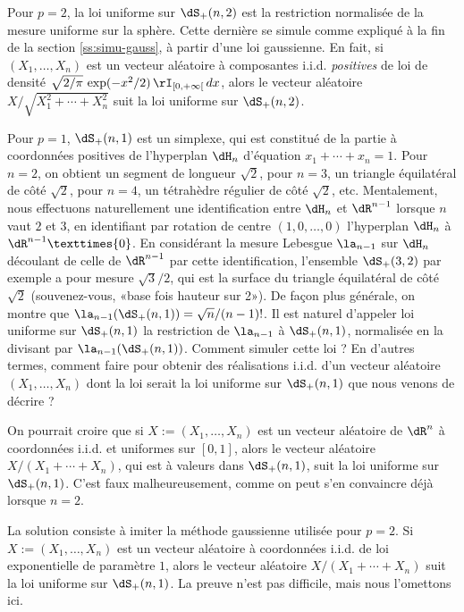 Pour $p=2$, la loi uniforme sur $\dS_+(n,2)$ est la restriction normalisée de
la mesure uniforme sur la sphère. Cette dernière se simule comme expliqué à la
fin de la section \ref{ss:simu-gauss}, à partir d'une loi gaussienne. En fait,
si $(X_1,\ldots,X_n)$ est un vecteur aléatoire à composantes i.i.d.
\emph{positives} de loi de densité
$\sqrt{2/\pi}\,\exp(-x^2/2)\,\rI_{[0,+\infty[}\,dx$, alors le vecteur aléatoire
$X/\sqrt{X_1^2+\cdots+X_n^2}$ suit la loi uniforme sur $\dS_+(n,2)$.

Pour $p=1$, $\dS_+(n,1)$ est un simplexe, qui est constitué de la partie à
coordonnées positives de l'hyperplan $\dH_n$ d'équation $x_1+\cdots+x_n=1$.
Pour $n=2$, on obtient un segment de longueur $\sqrt{2}$, pour $n=3$, un
triangle équilatéral de côté $\sqrt{2}$, pour $n=4$, un tétrahèdre régulier de
côté $\sqrt{2}$, etc.  Mentalement, nous effectuons naturellement une
identification entre $\dH_n$ et $\dR^{n-1}$ lorsque $n$ vaut $2$ et $3$, en
identifiant par rotation de centre $(1,0,\ldots,0)$ l'hyperplan $\dH_n$ à
$\dR^{n-1}×\{0\}$. En considérant la mesure Lebesgue $\la_{n-1}$ sur
$\dH_n$ découlant de celle de $\dR^{n-1}$ par cette identification, l'ensemble
$\dS_+(3,2)$ par exemple a pour mesure $\sqrt{3}/2$, qui est la surface du
triangle équilatéral de côté $\sqrt{2}$ (souvenez-vous, «base fois hauteur sur
2»). De façon plus générale, on montre que
$\la_{n-1}(\dS_+(n,1))=\sqrt{n}/(n-1)!$. Il est naturel d'appeler loi uniforme
sur $\dS_+(n,1)$ la restriction de $\la_{n-1}$ à $\dS_+(n,1)$, normalisée en
la divisant par $\la_{n-1}(\dS_+(n,1))$. Comment simuler cette loi ? En
d'autres termes, comment faire pour obtenir des réalisations i.i.d. d'un
vecteur aléatoire $(X_1,\ldots,X_n)$ dont la loi serait la loi uniforme sur
$\dS_+(n,1)$ que nous venons de décrire ?

On pourrait croire que si $X:=(X_1,\ldots,X_n)$ est un vecteur aléatoire de
$\dR^n$ à coordonnées i.i.d. et uniformes sur $[0,1]$, alors le vecteur
aléatoire $X/(X_1+\cdots+X_n)$, qui est à valeurs dans $\dS_+(n,1)$, suit la
loi uniforme sur $\dS_+(n,1)$. C'est faux malheureusement, comme on peut s'en
convaincre déjà lorsque $n=2$.

La solution consiste à imiter la méthode gaussienne utilisée pour $p=2$. Si
$X:=(X_1,\ldots,X_n)$ est un vecteur aléatoire à coordonnées i.i.d. de loi
exponentielle de paramètre $1$, alors le vecteur aléatoire
$X/(X_1+\cdots+X_n)$ suit la loi uniforme sur $\dS_+(n,1)$. La preuve n'est
pas difficile, mais nous l'omettons ici.

